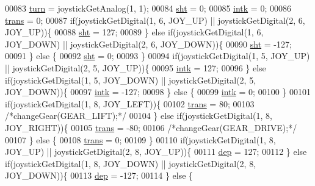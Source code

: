 \begin{DoxyCode}
00083     \hyperlink{opcontrol_8c_aaefa47f4fdf865c2358c22b542a993e4}{turn} = joystickGetAnalog(1, 1);
00084     \hyperlink{opcontrol_8c_ab9078d4ef28960b548a1621e2f6e9438}{sht} = 0;
00085     \hyperlink{opcontrol_8c_a0f71b6f71e93fa27c60c4dbbfc135bbb}{intk} = 0;
00086     \hyperlink{opcontrol_8c_a7039f0d5c4b6a662294b23dccf0bea0e}{trans} = 0;
00087     \textcolor{keywordflow}{if}(joystickGetDigital(1, 6, JOY\_UP) || joystickGetDigital(2, 6, JOY\_UP))\{
00088         \hyperlink{opcontrol_8c_ab9078d4ef28960b548a1621e2f6e9438}{sht} = 127;
00089     \} \textcolor{keywordflow}{else} \textcolor{keywordflow}{if}(joystickGetDigital(1, 6, JOY\_DOWN) || joystickGetDigital(2, 6, JOY\_DOWN))\{
00090         \hyperlink{opcontrol_8c_ab9078d4ef28960b548a1621e2f6e9438}{sht} = -127;
00091     \} \textcolor{keywordflow}{else} \{
00092         \hyperlink{opcontrol_8c_ab9078d4ef28960b548a1621e2f6e9438}{sht} = 0;
00093     \}
00094     \textcolor{keywordflow}{if}(joystickGetDigital(1, 5, JOY\_UP) || joystickGetDigital(2, 5, JOY\_UP))\{
00095         \hyperlink{opcontrol_8c_a0f71b6f71e93fa27c60c4dbbfc135bbb}{intk} = 127;
00096     \} \textcolor{keywordflow}{else} \textcolor{keywordflow}{if}(joystickGetDigital(1, 5, JOY\_DOWN) || joystickGetDigital(2, 5, JOY\_DOWN))\{
00097         \hyperlink{opcontrol_8c_a0f71b6f71e93fa27c60c4dbbfc135bbb}{intk} = -127;
00098     \} \textcolor{keywordflow}{else} \{
00099         \hyperlink{opcontrol_8c_a0f71b6f71e93fa27c60c4dbbfc135bbb}{intk} = 0;
00100     \}
00101     \textcolor{keywordflow}{if}(joystickGetDigital(1, 8, JOY\_LEFT))\{
00102         \hyperlink{opcontrol_8c_a7039f0d5c4b6a662294b23dccf0bea0e}{trans} = 80;
00103         \textcolor{comment}{/*changeGear(GEAR\_LIFT);*/}
00104     \} \textcolor{keywordflow}{else} \textcolor{keywordflow}{if}(joystickGetDigital(1, 8, JOY\_RIGHT))\{
00105         \hyperlink{opcontrol_8c_a7039f0d5c4b6a662294b23dccf0bea0e}{trans} = -80;
00106         \textcolor{comment}{/*changeGear(GEAR\_DRIVE);*/}
00107     \} \textcolor{keywordflow}{else} \{
00108         \hyperlink{opcontrol_8c_a7039f0d5c4b6a662294b23dccf0bea0e}{trans} = 0;
00109     \}
00110     \textcolor{keywordflow}{if}(joystickGetDigital(1, 8, JOY\_UP) || joystickGetDigital(2, 8, JOY\_UP))\{
00111         \hyperlink{opcontrol_8c_ada6c89c18e8b2a17151b9bc6b8ae060c}{dep} = 127;
00112     \} \textcolor{keywordflow}{else} \textcolor{keywordflow}{if}(joystickGetDigital(1, 8, JOY\_DOWN) || joystickGetDigital(2, 8, JOY\_DOWN))\{
00113         \hyperlink{opcontrol_8c_ada6c89c18e8b2a17151b9bc6b8ae060c}{dep} = -127;
00114     \} \textcolor{keywordflow}{else} \{

\end{DoxyCode}
